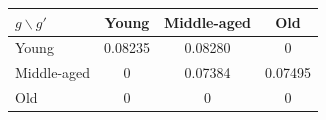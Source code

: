 \begin{tabular}{lccc}
\hline
$g \backslash g'$ & Young & Middle-aged & Old \\
\hline
Young & 0.08235 & 0.08280 & 0 \\
Middle-aged & 0 & 0.07384 & 0.07495 \\
Old & 0 & 0 & 0 \\
\hline
\end{tabular}
